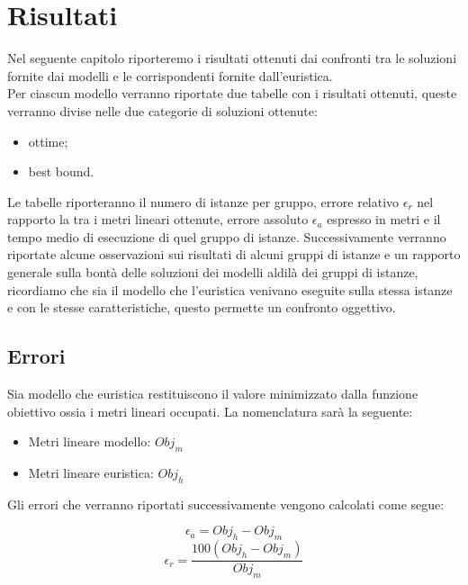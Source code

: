 
\hypertarget{(chap:capitolo7)}{}
\chapter{Risultati}
Nel seguente capitolo riporteremo i risultati ottenuti dai confronti tra le soluzioni fornite dai modelli e le corrispondenti fornite dall'euristica.\\
Per ciascun modello verranno riportate due tabelle con i risultati ottenuti, queste verranno divise nelle due categorie di soluzioni ottenute:
\begin{itemize}
	\item ottime;
	\item best bound.
\end{itemize} 
Le tabelle riporteranno il numero di istanze per gruppo, errore relativo $\epsilon_r$ nel rapporto la tra i metri lineari ottenute, errore assoluto $\epsilon_a$ espresso in metri e il tempo medio di esecuzione di quel gruppo di istanze. Successivamente verranno riportate alcune osservazioni sui risultati di alcuni gruppi di istanze e un rapporto generale sulla bontà delle soluzioni dei modelli aldilà dei gruppi di istanze, ricordiamo che sia il modello che l'euristica venivano eseguite sulla stessa istanze e con le stesse caratteristiche, questo permette un confronto oggettivo.

\newpage
\section{Errori}
Sia modello che euristica restituiscono il valore minimizzato dalla funzione obiettivo ossia i metri lineari occupati. La nomenclatura sarà la seguente:
\begin{itemize}
	\item Metri lineare modello: $Obj_m$
	\item Metri lineare euristica: $Obj_h$
\end{itemize}

Gli errori che verranno riportati successivamente vengono calcolati come segue:
\begin{center}
	$$\epsilon_a = Obj_h - Obj_m$$
	$$\epsilon_r = \frac{100 (Obj_h - Obj_m) }{Obj_m}$$
\end{center}

\newpage
